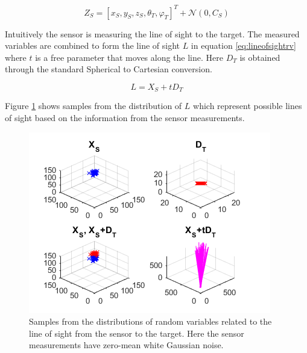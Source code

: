 \documentclass[journal]{IEEEtran}
\begin{document}
\begin{dmath} \label{eq:sensormeasurementvector}
    Z_S = [x_S, y_S, z_S, \theta_T, \varphi_T]^T + \mathcal{N}(0, C_S)
\end{dmath}

Intuitively the sensor is measuring the line of sight to the target. The measured variables are combined to form the line of sight $L$ in equation \ref{eq:lineofsightrv} where $t$ is a free parameter that moves along the line. Here $D_T$ is obtained through the standard Spherical to Cartesian conversion.

\begin{dmath} \label{eq:lineofsightrv}
    L = X_S + t D_T
\end{dmath}

Figure \ref{fig:measurementrvs} shows samples from the distribution of $L$ which represent possible lines of sight based on the information from the sensor measurements.

\begin{figure}[H]
 \centering
 \includegraphics[scale=0.8]{measurementrvs.png}
 \caption{Samples from the distributions of random variables related to the line of sight from the sensor to the target. Here the sensor measurements have zero-mean white Gaussian noise.}
 \label{fig:measurementrvs}
\end{figure}
\end{document}
